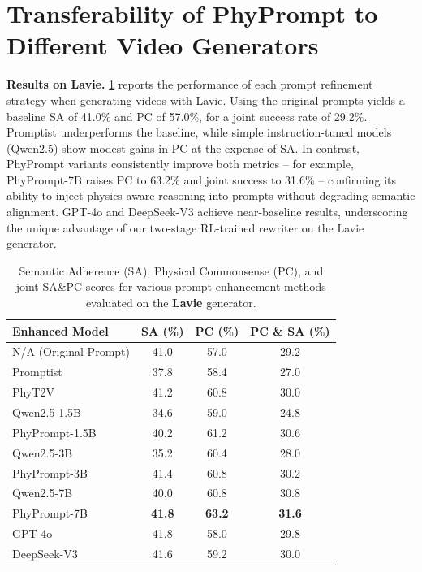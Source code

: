 \section{Transferability of PhyPrompt to Different Video Generators}
\textbf{Results on Lavie.}
\cref{tab:enhanced_models} reports the performance of each prompt refinement strategy when generating videos with Lavie. Using the original prompts yields a baseline SA of 41.0\% and PC of 57.0\%, for a joint success rate of 29.2\%. Promptist underperforms the baseline, while simple instruction-tuned models (Qwen2.5) show modest gains in PC at the expense of SA. In contrast, PhyPrompt variants consistently improve both metrics – for example, PhyPrompt-7B raises PC to 63.2\% and joint success to 31.6\% – confirming its ability to inject physics-aware reasoning into prompts without degrading semantic alignment. GPT-4o and DeepSeek-V3 achieve near-baseline results, underscoring the unique advantage of our two-stage RL-trained rewriter on the Lavie generator.
\begin{table}[ht]
  \centering
\caption{Semantic Adherence (SA), Physical Commonsense (PC), and joint SA\&PC scores for various prompt enhancement methods evaluated on the \textbf{Lavie} generator.}
  \label{tab:enhanced_models}
  \setlength{\tabcolsep}{3pt}
  \begin{tabular}{lccc}
    \toprule
    \textbf{Enhanced Model} & \textbf{SA (\%)} & \textbf{PC (\%)} & \textbf{PC \& SA (\%)} \\
    \midrule
    N/A (Original Prompt) & 41.0 & 57.0 & 29.2 \\
    Promptist             & 37.8 & 58.4 & 27.0 \\
    PhyT2V                & 41.2 & 60.8 & 30.0 \\
    \midrule
    Qwen2.5-1.5B          & 34.6 & 59.0 & 24.8 \\
    PhyPrompt-1.5B        & 40.2 & 61.2 & 30.6 \\
    Qwen2.5-3B            & 35.2 & 60.4 & 28.0 \\
    PhyPrompt-3B          & 41.4 & 60.8 & 30.2 \\
    Qwen2.5-7B            & 40.0 & 60.8 & 30.8 \\
    PhyPrompt-7B          & \textbf{41.8} & \textbf{63.2} & \textbf{31.6}\\
    \midrule
    GPT-4o                & 41.8 & 58.0 & 29.8 \\
    DeepSeek-V3           & 41.6 & 59.2 & 30.0 \\
    \bottomrule
  \end{tabular}
\end{table}

